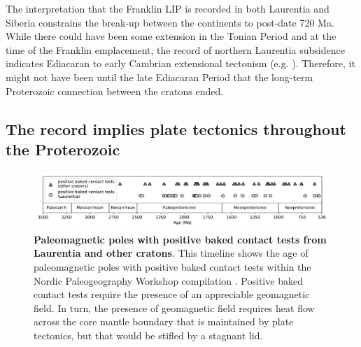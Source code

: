 \documentclass[twocolumn, switch]{article} %
\begin{document}
The interpretation that the Franklin LIP is recorded in both Laurentia and Siberia constrains the break-up between the continents to post-date 720 Ma. While there could have been some extension in the Tonian Period and at the time of the Franklin emplacement, the record of northern Laurentia subsidence indicates Ediacaran to early Cambrian extensional tectonism (e.g. \citealp{Strauss2019a}). Therefore, it might not have been until the late Ediacaran Period that the long-term Proterozoic connection between the cratons ended.

\subsection{The record implies plate tectonics throughout the Proterozoic}
\label{sec:plate_tectonics}

\begin{figure}
\centering
\includegraphics[width=\textwidth]{../Figures/Fig9_baked_contact_timeline_all.pdf}
\caption{\textbf{Paleomagnetic poles with positive baked contact tests from Laurentia and other cratons}. This timeline shows the age of paleomagnetic poles with positive baked contact tests within the Nordic Paleogeography Workshop compilation \citep{Evans2021a}. Positive baked contact tests require the presence of an appreciable geomagnetic field. In turn, the presence of geomagnetic field requires heat flow across the core mantle boundary that is maintained by plate tectonics, but that would be stifled by a stagnant lid.}
\label{fig:baked_contact}
\end{figure}
\end{document}
